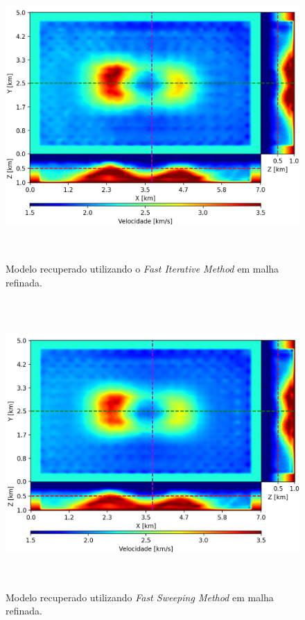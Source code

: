 \begin{figure}[H]
	\centering
	\includegraphics[width=16cm,height=11cm]{Imgs/Resultados/fim_refined.png}
	\caption{Modelo recuperado utilizando o \textit{Fast Iterative Method} em malha refinada.}
	\label{fig:fim_refined}	
\end{figure}

\begin{figure}[H]
	\centering
	\includegraphics[width=16cm,height=11cm]{Imgs/Resultados/fsm_refined.png}
	\caption{Modelo recuperado utilizando \textit{Fast Sweeping Method} em malha refinada.}
	\label{fig:fsm_refined}	
\end{figure}

